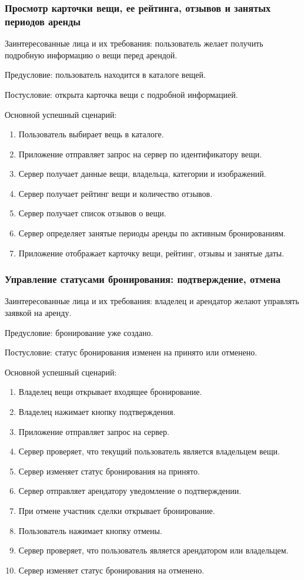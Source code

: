 \subsubsection{Просмотр карточки вещи, ее рейтинга, отзывов и занятых периодов аренды}
Заинтересованные лица и их требования: пользователь желает получить подробную информацию о вещи перед арендой.

Предусловие: пользователь находится в каталоге вещей.

Постусловие: открыта карточка вещи с подробной информацией.

Основной успешный сценарий:
\begin{enumerate}
    \item Пользователь выбирает вещь в каталоге.
    \item Приложение отправляет запрос на сервер по идентификатору вещи.
    \item Сервер получает данные вещи, владельца, категории и изображений.
    \item Сервер получает рейтинг вещи и количество отзывов.
    \item Сервер получает список отзывов о вещи.
    \item Сервер определяет занятые периоды аренды по активным бронированиям.
    \item Приложение отображает карточку вещи, рейтинг, отзывы и занятые даты.
\end{enumerate}

\subsubsection{Управление статусами бронирования: подтверждение, отмена}
Заинтересованные лица и их требования: владелец и арендатор желают управлять заявкой на аренду.

Предусловие: бронирование уже создано.

Постусловие: статус бронирования изменен на принято или отменено.

Основной успешный сценарий:
\begin{enumerate}
    \item Владелец вещи открывает входящее бронирование.
    \item Владелец нажимает кнопку подтверждения.
    \item Приложение отправляет запрос на сервер.
    \item Сервер проверяет, что текущий пользователь является владельцем вещи.
    \item Сервер изменяет статус бронирования на принято.
    \item Сервер отправляет арендатору уведомление о подтверждении.
    \item При отмене участник сделки открывает бронирование.
    \item Пользователь нажимает кнопку отмены.
    \item Сервер проверяет, что пользователь является арендатором или владельцем.
    \item Сервер изменяет статус бронирования на отменено.
\end{enumerate}
